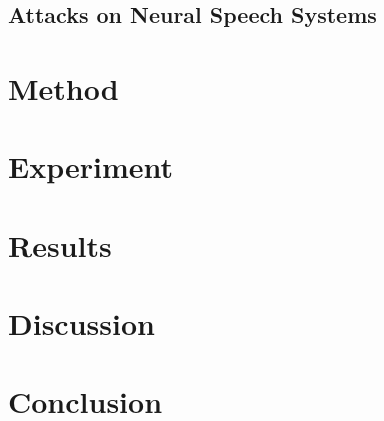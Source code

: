 \documentclass[11pt]{article}
\begin{document}
\citet{stefanos2023jingleback} %

\subsection{Attacks on Neural Speech Systems}
\citet{neekhara2019universal} %

\citet{kreuk2018fooling} %

\section{Method}
\citet{kai2022lightweight} %

\section{Experiment}

\section{Results}

\section{Discussion}

\section{Conclusion}



\appendix
\end{document}
